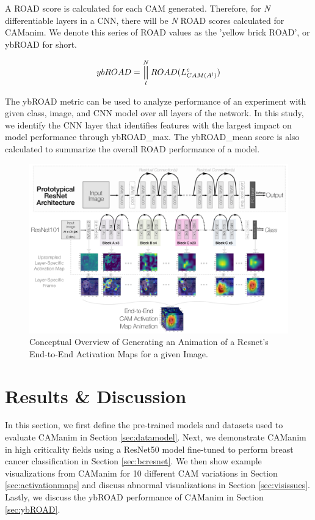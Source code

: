 \documentclass[10pt, conference, compsocconf]{IEEEtran}
\DeclareMathOperator*{\concat}{\scalerel*{\Vert}{\sum}}
\begin{document}
A ROAD score is calculated for each CAM generated. Therefore, for \textit{N} differentiable layers in a CNN, there will be \textit{N} ROAD scores calculated for CAManim. We denote this series of ROAD values as the 'yellow brick ROAD', or ybROAD for short.

\begin{equation}\label{eqn:cam-form}
ybROAD = \concat_{l}^{N}ROAD(L^c_{CAM(A^{l})})
\end{equation}

The ybROAD metric can be used to analyze performance of an experiment with given class, image, and CNN model over all layers of the network. In this study, we identify the CNN layer that identifies features with the largest impact on model performance through ybROAD\_{max}. The ybROAD\_{mean} score is also calculated to summarize the overall ROAD performance of a model.


\begin{figure}
    \centering
    \includegraphics[width=\textwidth]{figures/conceptual-overview.pdf}
    \caption{Conceptual Overview of Generating an Animation of a Resnet's End-to-End Activation Maps for a given Image.}
    \label{fig:overview}
\end{figure}



\section{Results \& Discussion}
In this section, we first define the pre-trained models and datasets used to evaluate CAManim in Section \ref{sec:datamodel}. Next, we demonstrate CAManim in high criticality fields using a ResNet50 model fine-tuned to perform breast cancer classification in Section \ref{sec:bcresnet}. We then show example visualizations from CAManim for 10 different CAM variations in Section \ref{sec:activationmaps} and discuss abnormal visualizations in Section \ref{sec:visissues}. Lastly, we discuss the ybROAD performance of CAManim in Section \ref{sec:ybROAD}.
\end{document}
